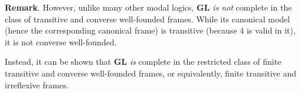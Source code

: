 \documentclass[12pt]{article}
\begin{document}
\textbf{Remark}.  However, unlike many other modal logics, \textbf{GL} \emph{is not} complete in the class of transitive and converse well-founded frames.  While its canonical model (hence the corresponding canonical frame) is transitive (because 4 is valid in it), it is not converse well-founded.

Instead, it can be shown that \textbf{GL} \emph{is} complete in the restricted class of finite transitive and converse well-founded frames, or equivalently, finite transitive and irreflexive frames.

\end{document}
